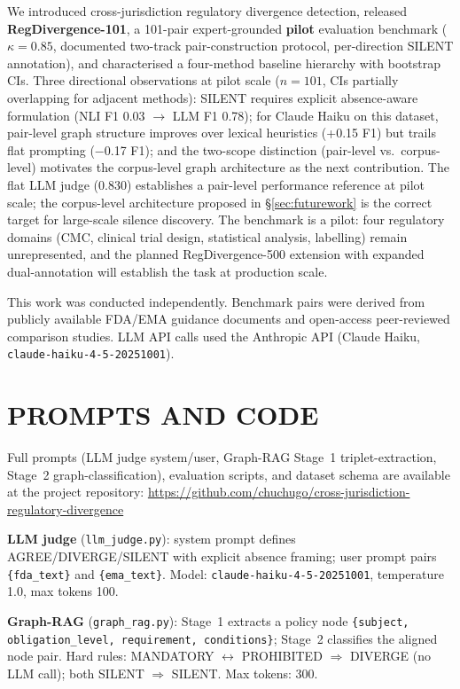 \documentclass[manuscript]{acmart}
\makeatletter
\let\@acmt@@section\section
\renewcommand{\section}[1]{%
  \@acmt@@section{\texorpdfstring{\MakeUppercase{#1}}{#1}}}
\makeatother
\begin{document}
We introduced cross-jurisdiction regulatory divergence detection, released
\textbf{RegDivergence-101}, a 101-pair expert-grounded \textbf{pilot}
evaluation benchmark ($\kappa = 0.85$, documented two-track pair-construction
protocol, per-direction SILENT annotation), and characterised a four-method
baseline hierarchy with bootstrap CIs. Three directional observations at pilot
scale ($n = 101$, CIs partially overlapping for adjacent methods): SILENT
requires explicit absence-aware formulation (NLI F1 0.03 $\to$ LLM F1 0.78);
for Claude Haiku on this dataset, pair-level graph structure improves over
lexical heuristics (+0.15 F1) but trails flat prompting ($-$0.17 F1); and
the two-scope distinction (pair-level vs.\ corpus-level) motivates the
corpus-level graph architecture as the next contribution. The flat LLM judge
(0.830) establishes a pair-level performance reference at pilot scale; the
corpus-level architecture proposed in \S\ref{sec:futurework} is the correct
target for large-scale silence discovery. The benchmark is a pilot: four regulatory domains (CMC,
clinical trial design, statistical analysis, labelling) remain unrepresented,
and the planned RegDivergence-500 extension with expanded dual-annotation will
establish the task at production scale.

\begin{acks}
This work was conducted independently. Benchmark pairs were derived from
publicly available FDA/EMA guidance documents and open-access peer-reviewed
comparison studies. LLM API calls used the Anthropic API (Claude Haiku,
\texttt{claude-haiku-4-5-20251001}).
\end{acks}




\appendix

\section{Prompts and Code}
\label{app:prompt}

Full prompts (LLM judge system/user, Graph-RAG Stage~1 triplet-extraction,
Stage~2 graph-classification), evaluation scripts, and dataset schema are
available at the project repository:
\url{https://github.com/chuchugo/cross-jurisdiction-regulatory-divergence}

\noindent\textbf{LLM judge} (\texttt{llm\_judge.py}): system prompt defines
AGREE/DIVERGE/SILENT with explicit absence framing; user prompt pairs
\texttt{\{fda\_text\}} and \texttt{\{ema\_text\}}.
Model: \texttt{claude-haiku-4-5-20251001}, temperature 1.0, max tokens 100.

\noindent\textbf{Graph-RAG} (\texttt{graph\_rag.py}): Stage~1 extracts a
policy node \texttt{\{subject, obligation\_level, requirement, conditions\}};
Stage~2 classifies the aligned node pair. Hard rules: MANDATORY
$\leftrightarrow$ PROHIBITED $\Rightarrow$ DIVERGE (no LLM call); both
SILENT $\Rightarrow$ SILENT. Max tokens: 300.
\end{document}
